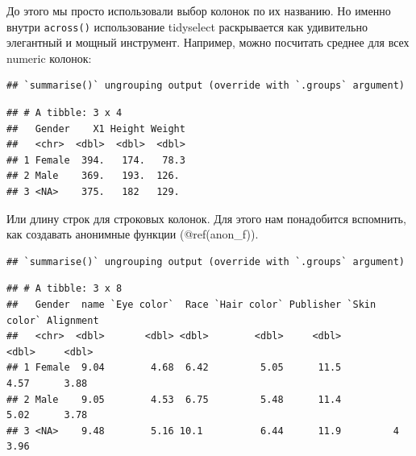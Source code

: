 \documentclass[
]{book}
\newenvironment{Shaded}{\begin{snugshade}}{\end{snugshade}}
\newcommand{\ControlFlowTok}[1]{\textcolor[rgb]{0.13,0.29,0.53}{\textbf{#1}}}
\newcommand{\DataTypeTok}[1]{\textcolor[rgb]{0.13,0.29,0.53}{#1}}
\newcommand{\KeywordTok}[1]{\textcolor[rgb]{0.13,0.29,0.53}{\textbf{#1}}}
\newcommand{\NormalTok}[1]{#1}
\newcommand{\OperatorTok}[1]{\textcolor[rgb]{0.81,0.36,0.00}{\textbf{#1}}}
\newcommand{\OtherTok}[1]{\textcolor[rgb]{0.56,0.35,0.01}{#1}}
\newcommand{\StringTok}[1]{\textcolor[rgb]{0.31,0.60,0.02}{#1}}
\begin{document}
До этого мы просто использовали выбор колонок по их названию. Но именно внутри \texttt{across()} использование tidyselect раскрывается как удивительно элегантный и мощный инструмент. Например, можно посчитать среднее для всех numeric колонок:

\begin{Shaded}
\end{Shaded}

\begin{verbatim}
## `summarise()` ungrouping output (override with `.groups` argument)
\end{verbatim}

\begin{verbatim}
## # A tibble: 3 x 4
##   Gender    X1 Height Weight
##   <chr>  <dbl>  <dbl>  <dbl>
## 1 Female  394.   174.   78.3
## 2 Male    369.   193.  126. 
## 3 <NA>    375.   182   129.
\end{verbatim}

Или длину строк для строковых колонок. Для этого нам понадобится вспомнить, как создавать анонимные функции (@ref(anon\_f)).

\begin{Shaded}
\end{Shaded}

\begin{verbatim}
## `summarise()` ungrouping output (override with `.groups` argument)
\end{verbatim}

\begin{verbatim}
## # A tibble: 3 x 8
##   Gender  name `Eye color`  Race `Hair color` Publisher `Skin color` Alignment
##   <chr>  <dbl>       <dbl> <dbl>        <dbl>     <dbl>        <dbl>     <dbl>
## 1 Female  9.04        4.68  6.42         5.05      11.5         4.57      3.88
## 2 Male    9.05        4.53  6.75         5.48      11.4         5.02      3.78
## 3 <NA>    9.48        5.16 10.1          6.44      11.9         4         3.96
\end{verbatim}
\end{document}

